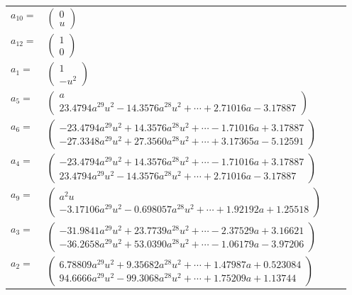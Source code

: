 \documentclass[1p]{elsarticle_modified}
\theoremstyle{definition}
\begin{document}
\begin{tabular}{m{7pt} m{180pt} m{7pt} m{180pt} }
\flushright $a_{10}=$&$\begin{pmatrix}0\\u\end{pmatrix}$ \\
\flushright $a_{12}=$&$\begin{pmatrix}1\\0\end{pmatrix}$ \\
\flushright $a_{1}=$&$\begin{pmatrix}1\\- u^2\end{pmatrix}$ \\
\flushright $a_{5}=$&$\begin{pmatrix}a\\23.4794 a^{29} u^{2}-14.3576 a^{28} u^{2}+\cdots+2.71016 a-3.17887\end{pmatrix}$ \\
\flushright $a_{6}=$&$\begin{pmatrix}-23.4794 a^{29} u^{2}+14.3576 a^{28} u^{2}+\cdots-1.71016 a+3.17887\\-27.3348 a^{29} u^{2}+27.3560 a^{28} u^{2}+\cdots+3.17365 a-5.12591\end{pmatrix}$ \\
\flushright $a_{4}=$&$\begin{pmatrix}-23.4794 a^{29} u^{2}+14.3576 a^{28} u^{2}+\cdots-1.71016 a+3.17887\\23.4794 a^{29} u^{2}-14.3576 a^{28} u^{2}+\cdots+2.71016 a-3.17887\end{pmatrix}$ \\
\flushright $a_{9}=$&$\begin{pmatrix}a^2 u\\-3.17106 a^{29} u^{2}-0.698057 a^{28} u^{2}+\cdots+1.92192 a+1.25518\end{pmatrix}$ \\
\flushright $a_{3}=$&$\begin{pmatrix}-31.9841 a^{29} u^{2}+23.7739 a^{28} u^{2}+\cdots-2.37529 a+3.16621\\-36.2658 a^{29} u^{2}+53.0390 a^{28} u^{2}+\cdots-1.06179 a-3.97206\end{pmatrix}$ \\
\flushright $a_{2}=$&$\begin{pmatrix}6.78809 a^{29} u^{2}+9.35682 a^{28} u^{2}+\cdots+1.47987 a+0.523084\\94.6666 a^{29} u^{2}-99.3068 a^{28} u^{2}+\cdots+1.75209 a+1.13744\end{pmatrix}$ \\

\end{tabular}
\end{document}
